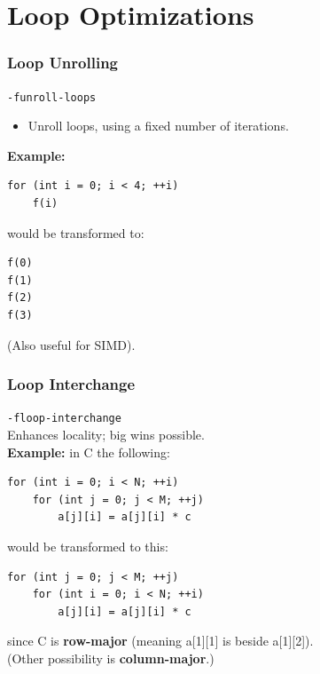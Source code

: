 \section{Loop Optimizations}
\begin{frame}[fragile]
  \frametitle{Loop Unrolling}

  
  {\tt -funroll-loops}
  \begin{itemize}
    \item Unroll loops, using a fixed number of iterations.
  \end{itemize}
  \vfill
  {\bf Example:}

  \begin{lstlisting}
for (int i = 0; i < 4; ++i)
    f(i)
  \end{lstlisting}

would be transformed to:

  \begin{lstlisting}
f(0)
f(1)
f(2)
f(3)
  \end{lstlisting}
(Also useful for SIMD).
  
\end{frame}

\begin{frame}[fragile]
  \frametitle{Loop Interchange}

  
  {\tt -floop-interchange}\\
  Enhances locality; big wins possible.\\[1em]

  {\bf Example:} in C the following:
  \begin{lstlisting}
for (int i = 0; i < N; ++i)
    for (int j = 0; j < M; ++j)
        a[j][i] = a[j][i] * c
  \end{lstlisting}
  would be transformed to this:
  \begin{lstlisting}
for (int j = 0; j < M; ++j)
    for (int i = 0; i < N; ++i)
        a[j][i] = a[j][i] * c
  \end{lstlisting}
  since C is {\bf row-major} (meaning a[1][1] is beside a[1][2]).\\
  (Other
  possibility is {\bf column-major}.)
  
\end{frame}

